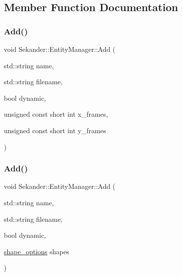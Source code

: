 \subsection{Member Function Documentation}
\mbox{\label{classSekander_1_1EntityManager_afaae67bb65ba3dac38417caf4e2c2f2b}} 
\subsubsection{\texorpdfstring{Add()}{Add()}\hspace{0.1cm}{\footnotesize\ttfamily [1/2]}}
{\footnotesize\ttfamily void Sekander\+::\+Entity\+Manager\+::\+Add (\begin{DoxyParamCaption}\item[{std\+::string}]{name,  }\item[{std\+::string}]{filename,  }\item[{bool}]{dynamic,  }\item[{unsigned const short int}]{x\+\_\+frames,  }\item[{unsigned const short int}]{y\+\_\+frames }\end{DoxyParamCaption})}

\mbox{\label{classSekander_1_1EntityManager_a4b0fdd5fb634533e04fe33c48a25f6e9}} 
\subsubsection{\texorpdfstring{Add()}{Add()}\hspace{0.1cm}{\footnotesize\ttfamily [2/2]}}
{\footnotesize\ttfamily void Sekander\+::\+Entity\+Manager\+::\+Add (\begin{DoxyParamCaption}\item[{std\+::string}]{name,  }\item[{std\+::string}]{filename,  }\item[{bool}]{dynamic,  }\item[{\hyperlink{namespaceSekander_aed8eb219f4685b29738464e9f32c5d94}{shape\+\_\+options}}]{shapes }\end{DoxyParamCaption})}

